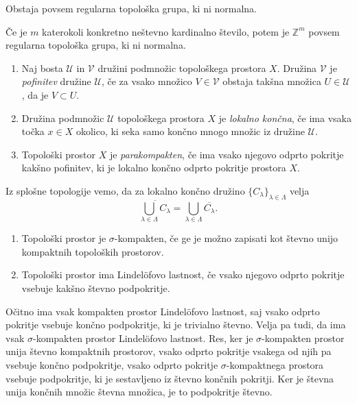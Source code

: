 \documentclass[mat1]{fmfdelo}
\newcommand{\Z}{\mathbb Z}
\newcommand{\closure}[1]{\overline{#1}}
\begin{document}
\begin{izrek}
Obstaja povsem regularna topološka grupa, ki ni normalna.
\end{izrek}

\begin{izrek}\label{izr:t4protiprimer}
	Če je $m$ katerokoli konkretno neštevno kardinalno število, potem je $\Z^{m}$ povsem regularna topološka grupa, ki ni normalna.
\end{izrek}

\begin{definicija}\label{def:parakompakt}
	\begin{enumerate}
		\item Naj bosta $\mathcal{U}$ in $\mathcal{V}$ družini podmnožic topološkega prostora $X$. Družina $\mathcal{V}$ je \emph{pofinitev} družine $\mathcal{U}$, če za vsako množico $V \in \mathcal{V}$ obstaja takšna množica $U \in \mathcal{U}$, da je $V \subset U$.
		\item Družina podmnožic $\mathcal{U}$ topološkega prostora $X$ je \emph{lokalno končna}, če ima vsaka točka $x \in X$ okolico, ki seka samo končno mnogo množic iz družine $\mathcal{U}$.
		\item Topološki prostor $X$ je \emph{parakompakten}, če ima vsako njegovo odprto pokritje kakšno pofinitev, ki je lokalno končno odprto pokritje prostora $X$.
	\end{enumerate}
\end{definicija}

\begin{opomba}\label{opo:lokkon} %
Iz splošne topologije vemo, da za lokalno končno družino $\lbrace C_\lambda \rbrace_{\lambda \in \Lambda}$ velja
\[ \closure{\bigcup_{\lambda \in \Lambda} C_\lambda} = \bigcup_{\lambda \in \Lambda} \closure{C_\lambda}. \]
\end{opomba}

\begin{definicija}
\begin{enumerate}
\item Topološki prostor je $\sigma$-kompakten, če ge je možno zapisati kot števno unijo kompaktnih topoloških prostorov.
\item Topološki prostor ima Lindel\"ofovo lastnost, če vsako njegovo odprto pokritje vsebuje kakšno števno podpokritje.
\end{enumerate}
\end{definicija}

Očitno ima vsak kompakten prostor Lindel\"ofovo lastnost, saj vsako odprto pokritje vsebuje končno podpokritje, ki je trivialno števno. Velja pa tudi, da ima vsak $\sigma$-kompakten prostor Lindel\"ofovo lastnost. Res, ker je $\sigma$-kompakten prostor unija števno kompaktnih prostorov, vsako odprto pokritje vsakega od njih pa vsebuje končno podpokritje, vsako odprto pokritje $\sigma$-kompaktnega prostora vsebuje pod\-pok\-rit\-je, ki je sestavljeno iz števno končnih pokritji. Ker je števna unija končnih množic števna množica, je to podpokritje števno.
\end{document}
